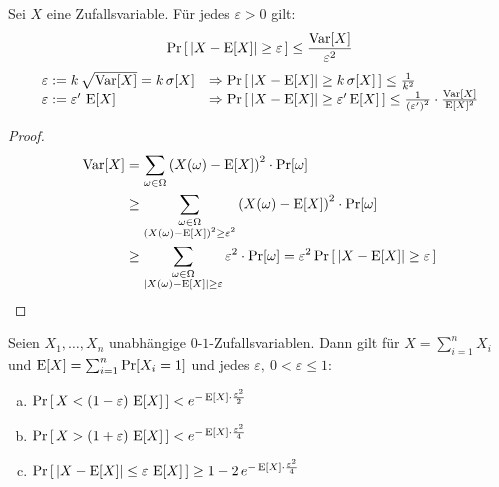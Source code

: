 \begin{satz}[Chebychev]
	Sei $X$ eine Zufallsvariable. Für jedes $\varepsilon > 0$ gilt:
	\[
	  \Pr\left[\,|X-\operatorname{E}[X]| \geq \varepsilon\,\right] \leq \frac{\operatorname{Var}[X]}{\varepsilon^2}
	\]
	\begin{equation*}
		\begin{array}{ll}
		\varepsilon := k\,\sqrt{\operatorname{Var}[X]} = k\,\sigma[X] &\Rightarrow
		\Pr\left[\,|X - \operatorname{E}[X]| \geq k\,\sigma[X]\,\right] \leq
		\frac{1}{k^2} \\
		\varepsilon := \varepsilon^\prime\,\operatorname{E}[X] &\Rightarrow \Pr\left[\,|X-\operatorname{E}[X]| \geq
		\varepsilon^\prime \operatorname{E}[X]\,\right] \leq
		\frac{1}{\left(\varepsilon^\prime\right)^2}\cdot\frac{\operatorname{Var}[X]}{\operatorname{E}[X]^2}
		\end{array}
	\end{equation*}
\end{satz}
\begin{proof}
	\begin{align*}
	  \operatorname{Var}[X] &= \sum_{\omega \in \Omega} \left(X(\omega) - \operatorname{E}[X]\right)^2
	  \cdot \Pr[\omega] \\ 
	  &\geq
	  \sum_{\substack{\omega\in\Omega\\\left(X(\omega)-\operatorname{E}[X]\right)^2\geq\varepsilon^2}}
	  \left(X(\omega) - \operatorname{E}[X]\right)^2 \cdot \Pr[\omega]\\
	  &\geq \sum_{\substack{\omega\in\Omega\\|X(\omega)-\operatorname{E}[X]|\geq\varepsilon}}
	  \varepsilon^2 \cdot \Pr[\omega] = \varepsilon^2 \Pr\left[\,|X-\operatorname{E}[X]| \geq
	  \varepsilon\,\right]
	\end{align*}
\end{proof}
\begin{satz}
	Seien $X_1, \dots, X_n$ unabhängige $0$-$1$-Zufallsvariablen. Dann gilt
	für $X = \sum_{i=1}^n X_i$ und $\operatorname{E}[X] = \sum_{i=1}^n \Pr[X_i = 1]$ und
	jedes $\varepsilon, \ 0 < \varepsilon \leq 1$:
	\begin{enumerate}[(a)]
		\item $\Pr\left[\,X < (1-\varepsilon)\,\operatorname{E}[X]\,\right] <
			e^{-\operatorname{E}[X]\cdot\frac{\varepsilon^2}{2}}$
		\item $\Pr\left[\,X > (1+\varepsilon)\,\operatorname{E}[X]\,\right] <
			e^{-\operatorname{E}[X]\cdot\frac{\varepsilon^2}{4}}$
		\item $\Pr\left[\,|X-\operatorname{E}[X]| \leq \varepsilon\,\operatorname{E}[X]\,\right] \geq 1 -
			2\,e^{-\operatorname{E}[X]\cdot\frac{\varepsilon^2}{4}}$
	\end{enumerate}
\end{satz}
